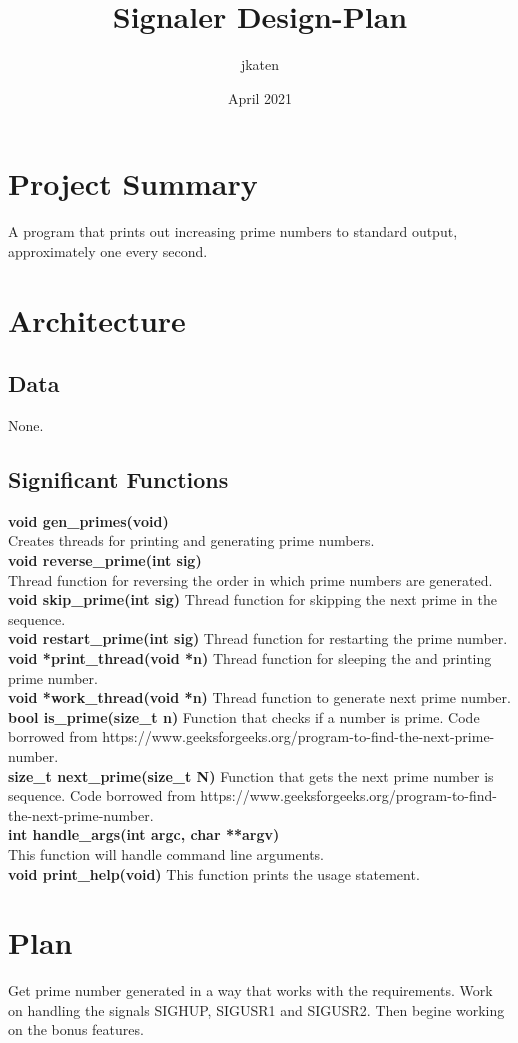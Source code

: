 \documentclass{article}
\title{Signaler Design-Plan}
\author{jkaten}
\date{April 2021}
\begin{document}
\maketitle

\section{Project Summary}

A program that prints out increasing prime numbers to standard output, approximately one every second.

\section{Architecture}

\subsection{Data}

None.

\subsection{Significant Functions}

\textbf{void gen\_primes(void)}
\\[.5cm]
Creates threads for printing and generating prime numbers.
\\[.5cm]
\textbf{void reverse\_prime(int sig)}
\\[.5cm]
Thread function for reversing the order in which prime numbers are generated.
\\[.5cm]
\textbf{void skip\_prime(int sig)}
Thread function for skipping the next prime in the sequence.
\\[.5cm]
\textbf{void restart\_prime(int sig)}
Thread function for restarting the prime number.
\\[.5cm]
\textbf{void *print\_thread(void *n)}
Thread function for sleeping the and printing prime number.
\\[.5cm]
\textbf{void *work\_thread(void *n)}
Thread function to generate next prime number.
\\[.5cm]
\textbf{bool is\_prime(size\_t n)}
Function that checks if a number is prime. Code borrowed from https://www.geeksforgeeks.org/program-to-find-the-next-prime-number.
\\[.5cm]
\textbf{size\_t next\_prime(size\_t N)}
Function that gets the next prime number is sequence. Code borrowed from https://www.geeksforgeeks.org/program-to-find-the-next-prime-number.
\\[.5cm]
\textbf{int handle\_args(int argc, char **argv)}
\\[.5cm]
This function will handle command line arguments.
\\[.5cm]
\textbf{void print\_help(void)}
This function prints the usage statement.

\section{Plan}
Get prime number generated in a way that works with the requirements. Work on handling the signals SIGHUP, SIGUSR1 and SIGUSR2. Then begine working on the bonus features.
\end{document}
